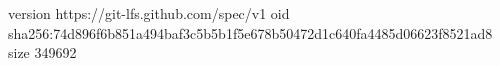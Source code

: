 version https://git-lfs.github.com/spec/v1
oid sha256:74d896f6b851a494baf3c5b5b1f5e678b50472d1c640fa4485d06623f8521ad8
size 349692
